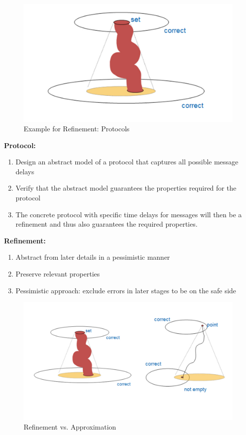 {\begin{figure}[!htb]
\centering
\includegraphics[scale=0.33]{figures/mm-hpi20.pdf}
\caption{Example for Refinement: Protocols}
\label{fig:MMFig16}
\end{figure}

{\bf Protocol:}

\begin{enumerate}
    \item Design an abstract model of a protocol that captures all possible message delays 
\item Verify that the abstract model guarantees the properties required for the protocol
\item The concrete protocol with specific time delays for messages will then be a refinement and thus also guarantees the required properties.
\end{enumerate}

{\bf Refinement:}

\begin{enumerate}
    \item Abstract from later details in a pessimistic manner
\item Preserve relevant properties
\item Pessimistic approach: 
exclude errors in later stages to be on the safe side
    
\end{enumerate}




\begin{figure}[!htb]
\centering
\includegraphics[scale=0.33]{figures/mm-hpi21.pdf}
\caption{Refinement vs. Approximation}
\label{fig:MMFig17}
\end{figure}

}
